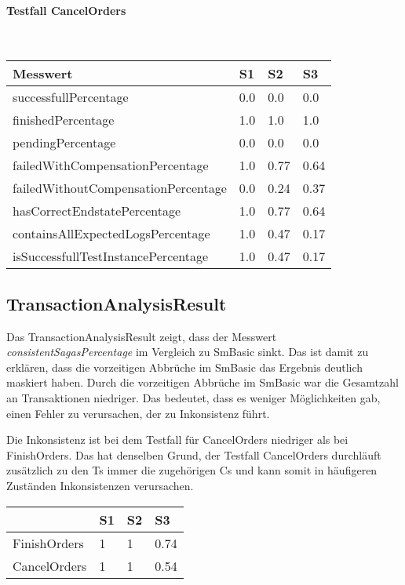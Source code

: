\paragraph*{Testfall CancelOrders} \mbox{}\\
\begin{center}
	\fontsize{9}{12}\selectfont
	\begin{longtable}[h]{|p{5cm}|p{1cm}|p{1cm}|p{1cm}|}
		\hline
		Messwert & S1 & S2 & S3 \\ \hline
		\endhead
		\endfoot
		successfull\-Percentage & 0.0 & 0.0 & 0.0 \\ \hline
		finished\-Percentage & 1.0 & 1.0 & 1.0 \\ \hline
		pending\-Percentage & 0.0 & 0.0 & 0.0 \\ \hline
		failedWithCompensation\-Percentage & 1.0 & 0.77 & 0.64 \\ \hline
		failedWithoutCompensation\-Percentage & 0.0 & 0.24 & 0.37 \\ \hline
		hasCorrectEndstate\-Percentage & 1.0 & 0.77 & 0.64 \\ \hline
		containsAllExpectedLogs\-Percentage & 1.0 & 0.47 & 0.17 \\ \hline
		isSuccessfullTestInstance\-Percentage & 1.0 & 0.47 & 0.17 \\ \hline
	\end{longtable}
\end{center}
\FloatBarrier

\subsection{TransactionAnalysisResult}
Das TransactionAnalysisResult zeigt, dass der Messwert \textit{consistentSagasPercentage} im Vergleich zu SmBasic sinkt. Das ist damit zu erklären, dass die vorzeitigen Abbrüche im SmBasic das Ergebnis deutlich maskiert haben. Durch die vorzeitigen Abbrüche im SmBasic war die Gesamtzahl an Transaktionen niedriger. Das bedeutet, dass es weniger Möglichkeiten gab, einen Fehler zu verursachen, der zu Inkonsistenz führt.

Die Inkonsistenz ist bei dem Testfall für CancelOrders niedriger als bei FinishOrders. Das hat denselben Grund, der Testfall CancelOrders durchläuft zusätzlich zu den Ts immer die zugehörigen Cs und kann somit in häufigeren Zuständen Inkonsistenzen verursachen.

\begin{center}
	\fontsize{9}{12}\selectfont
	\begin{longtable}[h]{|p{5cm}|p{1cm}|p{1cm}|p{1cm}|}
		\hline
		& S1 & S2 & S3 \\ \hline
		\endhead
		\endfoot
		FinishOrders & 1 & 1 & 0.74\\ \hline	
		CancelOrders & 1 & 1 & 0.54\\ \hline
	\end{longtable}
\end{center}
\FloatBarrier